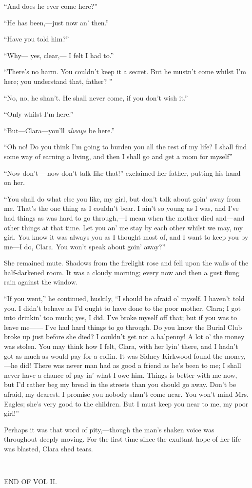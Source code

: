 ``And does he ever come here?''

{}``He has been,---just now an' then.''

``Have you told him?''

``Why--- yes, clear,--- I felt I had to.''

``There's no harm. You couldn't keep it a secret. But he mustn't come
whilst I'm here; you understand that, father? ''

``No, no, he shan't. He shall never come, if you don't wish it.''

``Only whilst I'm here.''

``But---Clara---you'll \emph{always} be here.''

``Oh no! Do you think I'm going to burden you all the rest of my life? I
shall find some way of earning a living, and then I shall go and get a
room for myself''

``Now don't--- now don't talk like that!'' exclaimed her father, putting
his hand on her.

``You shall do what else you like, my girl, but don't talk about goin'
away from me. That's the one thing as I couldn't bear. I ain't so young
as I was, and I've had things as was hard to go through,---I mean when
the mother died and---and other things at that time. Let you an' me stay
by each other whilst we may, my girl. You know it was {}always you as I
thought most of, and I want to keep you by me---I do, Clara. You won't
speak about goin' away?''

She remained mute. Shadows from the firelight rose and fell upon the
walls of the half-darkened room. It was a cloudy morning; every now and
then a gust flung rain against the window.

``If you went,'' he continued, huskily, ``I should be afraid o' myself.
I haven't told you. I didn't behave as I'd ought to have done to the
poor mother, Clara; I got into drinkin' too much; yes, I did. I've broke
myself off that; but if you was to leave me{{------}} I've had hard
things to go through. Do you know the Burial Club broke up just before
she died? I couldn't get not a ha'penny! A lot o' the money was stolen.
You may think how I felt, Clara, with her lyin' there, and I hadn't got
as much as would pay for a coffin. It was Sidney Kirkwood found the
money,---he did! There was never man had as good a friend as he's been
to me; I shall never have a chance of pay in' what I owe {}him. Things
is better with me now, but I'd rather beg my bread in the streets than
you should go away. Don't be afraid, my dearest. I promise you nobody
shan't come near. You won't mind Mrs. Eagles; she's very good to the
children. But I must keep you near to me, my poor girl!''

Perhaps it was that word of pity,---though the man's shaken voice was
throughout deeply moving. For the first time since the exultant hope of
her life was blasted, Clara shed tears.

~

END OF VOL II.
